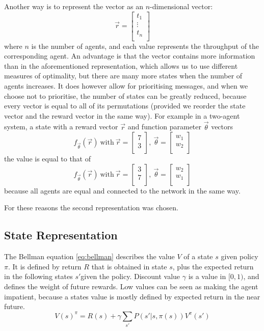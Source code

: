 \documentclass{article}
\begin{document}
\begin{multicols}{2}
		Another way is to represent the vector as an $n$-dimensional vector:
		$$\vec{r} = \begin{bmatrix}
			t_1\\
			\vdots\\
			t_n\\
		\end{bmatrix}$$
		where $n$ is the number of agents, and each value represents the
		throughput of the corresponding agent. An advantage is that the vector
		contains more information than in the aforementioned representation,
		which allows us to use different measures of optimality, but
		there are many more states when the number of agents increases. It does
		however allow for prioritising messages, and when we choose not to
		prioritise, the number of states can be greatly reduced, because every
		vector is equal to all of its permutations (provided we reorder the state
		vector and the reward vector in the same way).
		For example in a two-agent system, a state with a reward vector $\vec{r}$
		and function parameter $\vec{\theta}$
		vectors
		$$ f_{\vec{\theta}}(\vec{r})~\textrm{with}~\vec{r} = \begin{bmatrix}
			7\\
			3\\
		\end{bmatrix},~
		\vec{\theta} = \begin{bmatrix}
			w_1\\
			w_2\\
		\end{bmatrix}$$
		the value is equal to that of
		$$ f_{\vec{\theta}}(\vec{r})~\textrm{with}~\vec{r} = \begin{bmatrix}
			3\\
			7\\
		\end{bmatrix},~
		\vec{\theta} = \begin{bmatrix}
			w_2\\
			w_1\\
		\end{bmatrix}$$
		because all agents are equal and connected to the network in the same
		way.

		For these reasons the second representation was chosen.

		\subsection{State Representation}
		\label{sub:state_representation}
		The Bellman equation \ref{eq:bellman} describes the value $V$ of a state
		$s$ given policy $\pi$. It is defined by return $R$ that is obtained in
		state $s$, plus the expected return in the following states $s'$given the
		policy. Discount value $\gamma$ is a value in $[0, 1)$, and defines the
		weight of future rewards. Low values can be seen as making the agent
		impatient, because a states value is mostly defined by expected return in
		the near future.
		\begin{equation}
		\displaystyle
		V(s)^\pi = R(s) + \gamma\sum_{s'} P(s'|s, \pi(s)) V^\pi(s')
		\label{eq:bellman}
		\end{equation}


\end{multicols}
\end{document}
